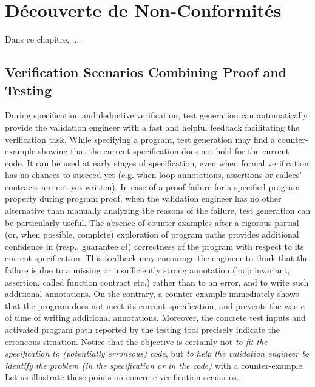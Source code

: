 
\chapter{Découverte de Non-Conformités}
\label{sec:ncd}

\chapterintro

Dans ce chapitre, ...


\section{Verification Scenarios Combining Proof and Testing}
\label{sec:scenarios}


During specification and deductive
verification, test generation  can automatically provide the
validation engineer with a fast and helpful feedback facilitating the
verification task. While specifying a program, test generation
may find a counter-example showing that the current specification does not hold
for the current code. It can be used at early stages of specification,
even when formal verification has no chances to succeed yet (e.g. when loop
annotations, assertions or callees' contracts are not yet written).
In case of a proof failure for a specified program
property during program proof, when the validation engineer has no other
alternative than manually analyzing the reasons of the failure, test generation 
can be particularly useful. The absence of counter-examples after a rigorous
partial (or, when possible, complete) exploration of program paths provides
additional confidence in (resp., guarantee of) correctness of the
program with respect to its current specification. This feedback may encourage
the engineer to think that the failure is due to a missing or insufficiently
strong annotation (loop invariant, assertion, called function contract etc.) 
rather than to an error,
and to write such additional annotations. On the contrary, a counter-example
immediately shows that the program does not meet its current specification, and
prevents the waste of time of writing additional annotations. Moreover, the
concrete test inputs and activated program path reported by the testing
tool precisely indicate the erroneous situation.
Notice that the objective is certainly not \emph{to fit the specification to
(potentially erroneous) code}, but \emph{to help the validation engineer
to identify the problem (in the specification or in the code)}
with a counter-example. 
Let us illustrate these points on concrete verification scenarios.

